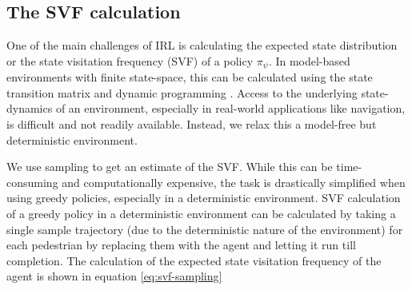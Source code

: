 \subsection{The SVF calculation}
One of the main challenges of IRL is calculating the expected state distribution or the state visitation frequency (SVF) of a policy $\pi_{\psi}$.  In model-based environments with finite state-space, this can be calculated using the state transition matrix and dynamic programming \cite{wulfmeier2015maximum}. Access to the underlying state-dynamics of an environment, especially in real-world applications like navigation, is difficult and not readily available. Instead, we relax this  a model-free but deterministic environment.\\

We use sampling to get an estimate of the SVF. While this can be time-consuming and computationally expensive, the task is drastically simplified when using greedy policies, especially in a deterministic environment. SVF calculation of a greedy policy in a deterministic environment can be calculated by taking a single sample trajectory (due to the deterministic nature of the environment) for each pedestrian by replacing them with the agent and letting it run till completion. The calculation of the expected state visitation frequency of the agent is shown in equation \autoref{eq:svf-sampling}

